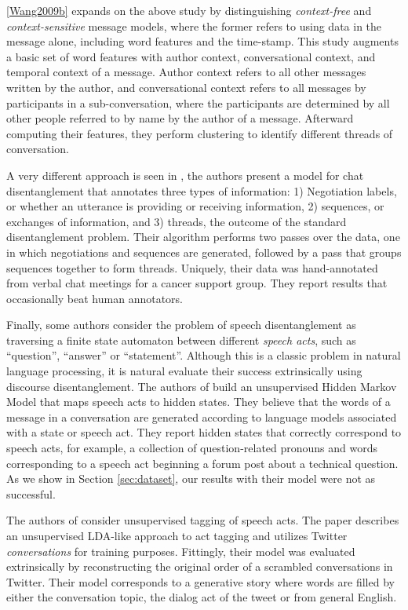 \documentclass{article}
\begin{document}
\ref{Wang2009b} expands on the above study by distinguishing
\textit{context-free} and \textit{context-sensitive} message models, where the 
former refers to using data in the message alone, including word features and the
time-stamp.  This study augments a basic set of word features with author context, 
conversational context, and temporal context of a message. Author context 
refers to all other messages written by the author, and conversational context 
refers to all messages by participants in a sub-conversation, 
where the participants are determined by all other people referred to by name 
by the author of a message.  Afterward computing their features, they perform
clustering to identify different threads of conversation.

A very different approach is seen in \cite{Mayfield2012a}, the authors present
a model for chat disentanglement that annotates three types of information: 1) 
Negotiation labels, or whether an utterance is providing or receiving 
information, 2) sequences, or exchanges of information, and 3) threads, the 
outcome of the standard disentanglement problem. Their algorithm performs 
two passes over the data,  one in which negotiations and sequences are generated, 
followed by a pass that groups sequences together to form threads. Uniquely,
their data was hand-annotated from verbal chat meetings for a cancer support group.
They report results that occasionally beat human annotators.

Finally, some authors consider the problem of speech disentanglement as traversing 
a finite state automaton between different \textit{speech acts}, such as
``question'', ``answer'' or ``statement''. Although this is a classic problem in
natural language processing, it is natural evaluate their success extrinsically 
using discourse disentanglement. The authors of \cite{Paula} build an 
unsupervised Hidden Markov Model that  maps speech acts to hidden states. 
They believe that the words of a message 
in a conversation are generated according to language models associated
with a state or speech act. They report hidden states
that correctly correspond to speech acts, for example, a collection of
question-related pronouns and words corresponding to a speech act beginning a
forum post about a technical question. As we show in Section \ref{sec:dataset}, 
our results with their model were not as successful.

The authors of \cite{Ritter2010a} consider unsupervised tagging of speech acts.
The paper describes an unsupervised LDA-like approach to act tagging 
and utilizes Twitter \textit{conversations} for
training purposes. Fittingly, their model was evaluated 
extrinsically by reconstructing the original order of a scrambled
conversations in Twitter. Their model corresponds to a generative story
where words are filled by either the conversation topic, the dialog
act of the tweet or from general English.
\end{document}
